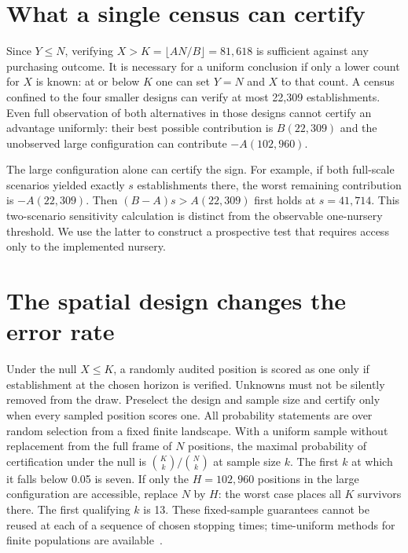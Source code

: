 \documentclass[10pt]{article}
\begin{document}
\section{What a single census can certify}
Since $Y\leq N$, verifying $X>K=\lfloor AN/B\rfloor=81{,}618$ is sufficient against any purchasing outcome. It is necessary for a uniform conclusion if only a lower count for $X$ is known: at or below $K$ one can set $Y=N$ and $X$ to that count. A census confined to the four smaller designs can verify at most 22,309 establishments. Even full observation of both alternatives in those designs cannot certify an advantage uniformly: their best possible contribution is $B(22{,}309)$ and the unobserved large configuration can contribute $-A(102{,}960)$.

The large configuration alone can certify the sign. For example, if both full-scale scenarios yielded exactly $s$ establishments there, the worst remaining contribution is $-A(22{,}309)$. Then $(B-A)s>A(22{,}309)$ first holds at $s=41{,}714$. This two-scenario sensitivity calculation is distinct from the observable one-nursery threshold. We use the latter to construct a prospective test that requires access only to the implemented nursery.

\section{The spatial design changes the error rate}
Under the null $X\leq K$, a randomly audited position is scored as one only if establishment at the chosen horizon is verified. Unknowns must not be silently removed from the draw. Preselect the design and sample size and certify only when every sampled position scores one. All probability statements are over random selection from a fixed finite landscape. With a uniform sample without replacement from the full frame of $N$ positions, the maximal probability of certification under the null is $\binom Kk/\binom Nk$ at sample size $k$. The first $k$ at which it falls below 0.05 is seven. If only the $H=102{,}960$ positions in the large configuration are accessible, replace $N$ by $H$: the worst case places all $K$ survivors there. The first qualifying $k$ is 13. These fixed-sample guarantees cannot be reused at each of a sequence of chosen stopping times; time-uniform methods for finite populations are available~\cite{wor}.
\end{document}
